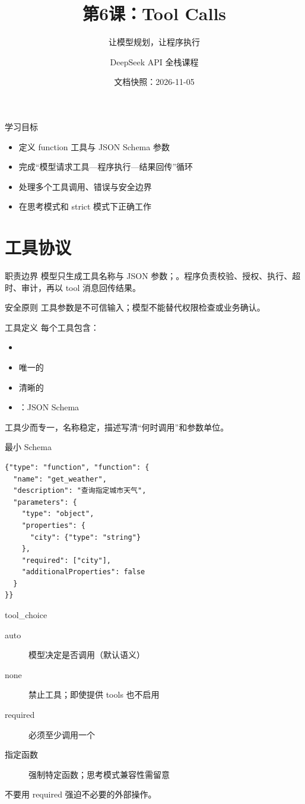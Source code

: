 \documentclass[aspectratio=169,UTF8]{ctexbeamer}
\title{第6课：Tool Calls}
\subtitle{让模型规划，让程序执行}
\author{DeepSeek API 全栈课程}
\date{文档快照：2026-11-05}
\begin{document}
\frame{\titlepage}
\begin{frame}{学习目标}
\begin{itemize}
  \item 定义 function 工具与 JSON Schema 参数
  \item 完成“模型请求工具—程序执行—结果回传”循环
  \item 处理多个工具调用、错误与安全边界
  \item 在思考模式和 strict 模式下正确工作
\end{itemize}
\end{frame}
\section{工具协议}
\begin{frame}{职责边界}
模型只生成工具名称与 JSON 参数；。程序负责校验、授权、执行、超时、审计，再以 tool 消息回传结果。
\begin{alertblock}{安全原则}
工具参数是不可信输入；模型不能替代权限检查或业务确认。
\end{alertblock}
\end{frame}
\begin{frame}{工具定义}
每个工具包含：
\begin{itemize}
  \item {}
  \item 唯一的 
  \item 清晰的 
  \item {}：JSON Schema
\end{itemize}
工具少而专一，名称稳定，描述写清“何时调用”和参数单位。
\end{frame}
\begin{frame}[fragile]{最小 Schema}
\begin{lstlisting}
{"type": "function", "function": {
  "name": "get_weather",
  "description": "查询指定城市天气",
  "parameters": {
    "type": "object",
    "properties": {
      "city": {"type": "string"}
    },
    "required": ["city"],
    "additionalProperties": false
  }
}}
\end{lstlisting}
\end{frame}
\begin{frame}{tool\_choice}
\begin{description}
  \item[auto] 模型决定是否调用（默认语义）
  \item[none] 禁止工具；即使提供 tools 也不启用
  \item[required] 必须至少调用一个
  \item[指定函数] 强制特定函数；思考模式兼容性需留意
\end{description}
不要用 required 强迫不必要的外部操作。
\end{frame}
\end{document}
